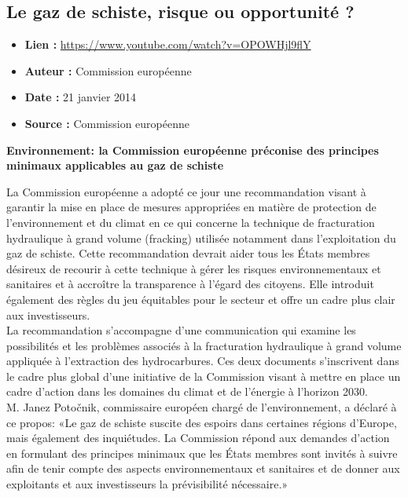 \documentclass[8pt]{article}
\begin{document}
\newpage
\subsection{Le gaz de schiste, risque ou opportunité ?}
 
\begin{itemize}
	\item \textbf{Lien : }  \url{https://www.youtube.com/watch?v=OPOWHjl9flY} 
	\item \textbf{Auteur : } Commission européenne
	\item \textbf{Date : } 21 janvier 2014
	\item \textbf{Source : } Commission européenne
\end{itemize}
\textbf{Environnement: la Commission européenne préconise des principes minimaux applicables au gaz de schiste}

La Commission européenne a adopté ce jour une recommandation visant à garantir la mise en place de mesures appropriées en matière de protection de l'environnement et du climat en ce qui concerne la technique de fracturation hydraulique à grand volume (fracking) utilisée notamment dans l'exploitation du gaz de schiste. Cette recommandation devrait aider tous les États membres désireux de recourir à cette technique à gérer les risques environnementaux et sanitaires et à accroître la transparence à l'égard des citoyens. Elle introduit également des règles du jeu équitables pour le secteur et offre un cadre plus clair aux investisseurs. \\

La recommandation s'accompagne d’une communication qui examine les possibilités et les problèmes associés à la fracturation hydraulique à grand volume appliquée à l’extraction des hydrocarbures. Ces deux documents s'inscrivent dans le cadre plus global d’une initiative de la Commission visant à mettre en place un cadre d'action dans les domaines du climat et de l'énergie à l'horizon 2030. \\

M. Janez Potočnik, commissaire européen chargé de l'environnement, a déclaré à ce propos: «Le gaz de schiste suscite des espoirs dans certaines régions d'Europe, mais également des inquiétudes. La Commission répond aux demandes d’action en formulant des principes minimaux que les États membres sont invités à suivre afin de tenir compte des aspects environnementaux et sanitaires et de donner aux exploitants et aux investisseurs la prévisibilité nécessaire.» \\
\end{document}
